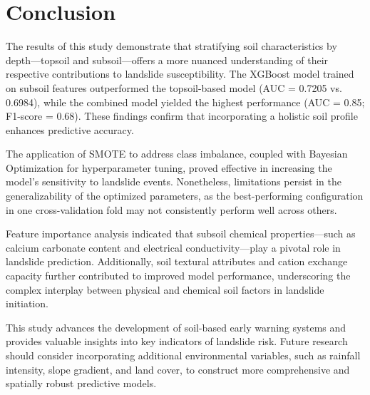 \section{Conclusion}

The results of this study demonstrate that stratifying soil characteristics by depth—topsoil and subsoil—offers a more nuanced understanding of their respective contributions to landslide susceptibility. The XGBoost model trained on subsoil features outperformed the topsoil-based model (AUC = 0.7205 vs. 0.6984), while the combined model yielded the highest performance (AUC = 0.85; F1-score = 0.68). These findings confirm that incorporating a holistic soil profile enhances predictive accuracy.

The application of SMOTE to address class imbalance, coupled with Bayesian Optimization for hyperparameter tuning, proved effective in increasing the model’s sensitivity to landslide events. Nonetheless, limitations persist in the generalizability of the optimized parameters, as the best-performing configuration in one cross-validation fold may not consistently perform well across others.

Feature importance analysis indicated that subsoil chemical properties—such as calcium carbonate content and electrical conductivity—play a pivotal role in landslide prediction. Additionally, soil textural attributes and cation exchange capacity further contributed to improved model performance, underscoring the complex interplay between physical and chemical soil factors in landslide initiation.

This study advances the development of soil-based early warning systems and provides valuable insights into key indicators of landslide risk. Future research should consider incorporating additional environmental variables, such as rainfall intensity, slope gradient, and land cover, to construct more comprehensive and spatially robust predictive models.